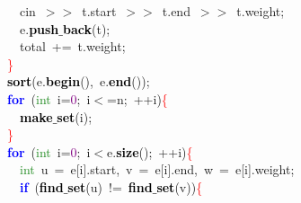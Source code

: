 {{\mbox{}\ \ \ \ \ \ cin\ \textcolor{BrickRed}{$>$$>$}\ t\textcolor{BrickRed}{.}start\ \textcolor{BrickRed}{$>$$>$}\ t\textcolor{BrickRed}{.}end\ \textcolor{BrickRed}{$>$$>$}\ t\textcolor{BrickRed}{.}weight\textcolor{BrickRed}{;} \\
\mbox{}\ \ \ \ \ \ e\textcolor{BrickRed}{.}\textbf{\textcolor{Black}{push$\_$back}}\textcolor{BrickRed}{(}t\textcolor{BrickRed}{);} \\
\mbox{}\ \ \ \ \ \ total\ \textcolor{BrickRed}{+=}\ t\textcolor{BrickRed}{.}weight\textcolor{BrickRed}{;} \\
\mbox{}\ \ \ \ \textcolor{Red}{\}} \\
\mbox{}\ \ \ \ \textbf{\textcolor{Black}{sort}}\textcolor{BrickRed}{(}e\textcolor{BrickRed}{.}\textbf{\textcolor{Black}{begin}}\textcolor{BrickRed}{(),}\ e\textcolor{BrickRed}{.}\textbf{\textcolor{Black}{end}}\textcolor{BrickRed}{());} \\
\mbox{}\ \ \ \ \textbf{\textcolor{Blue}{for}}\ \textcolor{BrickRed}{(}\textcolor{ForestGreen}{int}\ i\textcolor{BrickRed}{=}\textcolor{Purple}{0}\textcolor{BrickRed}{;}\ i\textcolor{BrickRed}{$<$=}n\textcolor{BrickRed}{;}\ \textcolor{BrickRed}{++}i\textcolor{BrickRed}{)}\textcolor{Red}{\{} \\
\mbox{}\ \ \ \ \ \ \textbf{\textcolor{Black}{make$\_$set}}\textcolor{BrickRed}{(}i\textcolor{BrickRed}{);} \\
\mbox{}\ \ \ \ \textcolor{Red}{\}} \\
\mbox{}\ \ \ \ \textbf{\textcolor{Blue}{for}}\ \textcolor{BrickRed}{(}\textcolor{ForestGreen}{int}\ i\textcolor{BrickRed}{=}\textcolor{Purple}{0}\textcolor{BrickRed}{;}\ i\textcolor{BrickRed}{$<$}e\textcolor{BrickRed}{.}\textbf{\textcolor{Black}{size}}\textcolor{BrickRed}{();}\ \textcolor{BrickRed}{++}i\textcolor{BrickRed}{)}\textcolor{Red}{\{} \\
\mbox{}\ \ \ \ \ \ \textcolor{ForestGreen}{int}\ u\ \textcolor{BrickRed}{=}\ e\textcolor{BrickRed}{[}i\textcolor{BrickRed}{].}start\textcolor{BrickRed}{,}\ v\ \textcolor{BrickRed}{=}\ e\textcolor{BrickRed}{[}i\textcolor{BrickRed}{].}end\textcolor{BrickRed}{,}\ w\ \textcolor{BrickRed}{=}\ e\textcolor{BrickRed}{[}i\textcolor{BrickRed}{].}weight\textcolor{BrickRed}{;} \\
\mbox{}\ \ \ \ \ \ \textbf{\textcolor{Blue}{if}}\ \textcolor{BrickRed}{(}\textbf{\textcolor{Black}{find$\_$set}}\textcolor{BrickRed}{(}u\textcolor{BrickRed}{)}\ \textcolor{BrickRed}{!=}\ \textbf{\textcolor{Black}{find$\_$set}}\textcolor{BrickRed}{(}v\textcolor{BrickRed}{))}\textcolor{Red}{\{} \\
}}
